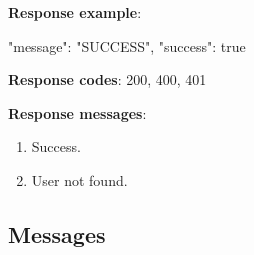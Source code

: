 \begin{itemize}
    \textbf{Response example}:

    \begin{spverbatim}
    {
        "message": "SUCCESS",
        "success": true
    }
    \end{spverbatim}

    \textbf{Response codes}: 200, 400, 401

    \textbf{Response messages}:
    \begin{enumerate}
        \item Success.
        \item User not found.
    \end{enumerate}

    \pagebreak
\end{itemize}

\subsection{Messages}\label{subsec: messages}
